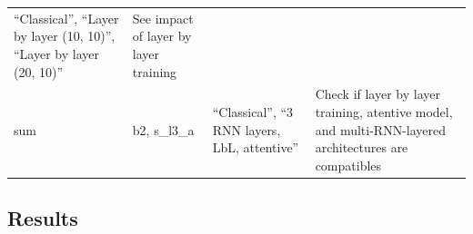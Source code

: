 \begin{longtable}[]{@{}llll@{}}
\begin{minipage}[t]{0.30\columnwidth}
``Classical'', ``Layer by layer (10, 10)'', ``Layer by layer (20,
10)''\strut
\end{minipage} & \begin{minipage}[t]{0.46\columnwidth}\raggedright\strut
See impact of layer by layer training\strut
\end{minipage}\tabularnewline
\begin{minipage}[t]{0.04\columnwidth}\raggedright\strut
sum\strut
\end{minipage} & \begin{minipage}[t]{0.08\columnwidth}\raggedright\strut
b2, s\_l3\_a\strut
\end{minipage} & \begin{minipage}[t]{0.30\columnwidth}\raggedright\strut
``Classical'', ``3 RNN layers, LbL, attentive''\strut
\end{minipage} & \begin{minipage}[t]{0.46\columnwidth}\raggedright\strut
Check if layer by layer training, atentive model, and multi-RNN-layered
architectures are compatibles\strut
\end{minipage}\tabularnewline
\bottomrule
\end{longtable}

\subsection{Results}\label{results}

